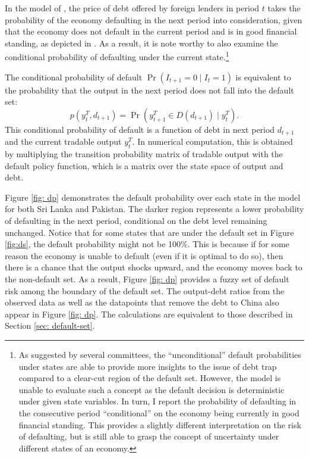 In the model of \citet{Na-18}, the price of debt offered by foreign lenders in period $t$ takes the probability of the economy defaulting in the next period into consideration, given that the economy does not default in the current period and is in good financial standing, as depicted in .
As a result, it is note worthy to also examine the conditional probability of defaulting under the current state.\footnote{%
    As suggested by several committees, the ``unconditional'' default probabilities under states are able to provide more insights to the issue of debt trap compared to a clear-cut region of the default set. However, the model is unable to evaluate such a concept as the default decision is deterministic under given state variables. In turn, I report the probability of defaulting in the consecutive period ``conditional'' on the economy being currently in good financial standing. This provides a slightly different interpretation on the risk of defaulting, but is still able to grasp the concept of uncertainty under different states of an economy.
}

The conditional probability of default $\Pr (I_{t+1} = 0 \mid I_{t} = 1)$ is equivalent to the probability that the output in the next period does not fall into the default set:
\begin{equation*}
    p(y^T_t, d_{t+1}) = \Pr (y^T_{t+1} \in D(d_{t+1}) \mid y^T_t).
\end{equation*}
This conditional probability of default is a function of debt in next period $d_{t+1}$ and the current tradable output $y^T_t$.
In numerical computation, this is obtained by multiplying the transition probability matrix of tradable output with the default policy function, which is a matrix over the state space of output and debt.

Figure \ref{fig: dp} demonstrates the default probability over each state in the model for both Sri Lanka and Pakistan. The darker region represents a lower probability of defaulting in the next period, conditional on the debt level remaining unchanged. Notice that for some states that are under the default set in Figure \ref{fig:ds}, the default probability might not be 100\%. This is because if for some reason the economy is unable to default (even if it is optimal to do so), then there is a chance that the output shocks upward, and the economy moves back to the non-default set. As a result, Figure \ref{fig: dp} provides a fuzzy set of default risk among the boundary of the default set.
The output-debt ratios from the observed data as well as the datapoints that remove the debt to China also appear in Figure \ref{fig: dp}. The calculations are equivalent to those described in Section \ref{sec: default-set}.

